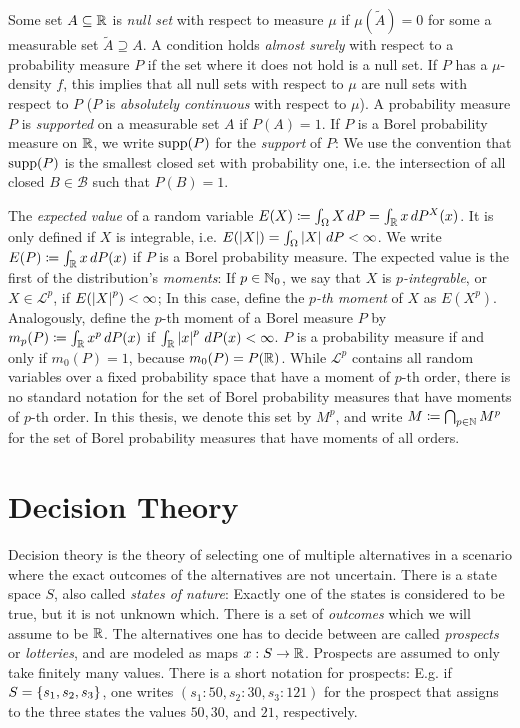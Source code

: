 \documentclass[a4paper,DIV=11]{scrreprt}
\newcommand{\B}{\mathcal{B}}
\theoremstyle{definition}
\begin{document}
    Some set $A \subseteq \mathbb{R}$ is \emph{null set} with respect to measure $\mu$ if $\mu(\tilde{A}) = 0$ for some a measurable set $\tilde{A} \supseteq A$.
    A condition holds \emph{almost surely} with respect to a probability measure $P$ if the set where it does not hold is a null set.
    If $P$ has a $\mu$-density $f$, this implies that all null sets with respect to $\mu$ are null sets with respect to $P$ ($P$ is \emph{absolutely continuous} with respect to $\mu$).
    A probability measure $P$ is \emph{supported} on a measurable set $A$ if $P(A) = 1$. If $P$ is a Borel probability measure on $\mathbb{R}$, we write $\operatorname{supp}(P)$ for the \emph{support} of $P$: We use the convention that $\operatorname{supp}(P)$ is the smallest closed set with probability one, i.e. the intersection of all closed $B \in \B$ such that $P(B) = 1$.
    \cite[p.63, p.170, Theorem 31.7]{bib:billingsleyProbabilityAndMeasure}
    
    The \emph{expected value} of a random variable $E(X) \coloneqq \int_{\Omega} X \, dP = \int_{\mathbb{R}} x \, dP^X(x)$. It is only defined if $X$ is integrable, i.e. $E(\left| X \right|) = \int_{\Omega} \left| X \right| \, dP < \infty$. We write $E(P) \coloneqq \int_{\mathbb{R}} x \, dP(x)$ if $P$ is a Borel probability measure.
    The expected value is the first of the distribution's \emph{moments}:
    If $p \in \mathbb{N}_0$, we say that $X$ is \emph{$p$-integrable}, or $X \in \mathcal{L}^p$, if $E(\left| X \right|^p) < \infty$;
    In this case, define the \emph{$p$-th moment} of $X$ as $E(X^p)$. Analogously, define the $p$-th moment of a Borel measure $P$ by $m_p(P) \coloneqq \int_{\mathbb{R}} x^p \, dP(x)$ if $\int_{\mathbb{R}} \left| x \right|^p \, dP(x) < \infty$.
    $P$ is a probability measure if and only if $m_0(P) = 1$, because $m_0(P) = P(\mathbb{R})$.
    While $\mathcal{L}^p$ contains all random variables over a fixed probability space that have a moment of $p$-th order, there is no standard notation for the set of Borel probability measures that have moments of $p$-th order. In this thesis, we denote this set by $M^p$, and write $M \coloneqq \bigcap_{p \in \mathbb{N}} M^p$ for the set of Borel probability measures that have moments of all orders.
    \cite[Section 21]{bib:billingsleyProbabilityAndMeasure}
    
    \section{Decision Theory}
    
    Decision theory is the theory of selecting one of multiple alternatives in a scenario where the exact outcomes of the alternatives are not uncertain.
    There is a state space $S$, also called \emph{states of nature}: Exactly one of the states is considered to be true, but it is not unknown which.
    There is a set of \emph{outcomes} which we will assume to be $\mathbb{R}$.
    The alternatives one has to decide between are called \emph{prospects} or \emph{lotteries}, and are modeled as maps $x: S \to \mathbb{R}$. Prospects are assumed to only take finitely many values. There is a short notation for prospects: E.g. if $S = \{s_1, s_2, s_3\}$, one writes $(s_1: 50, s_2: 30, s_3: 121)$ for the prospect that assigns to the three states the values $50, 30$, and $21$, respectively. \cite[Section 1.1]{bib:wakkerProspectTheory}
    
\end{document}
